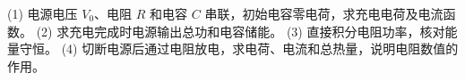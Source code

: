 (1) 电源电压 \(V_0\)、电阻 \(R\) 和电容 \(C\) 串联，初始电容零电荷，求充电电荷及电流函数。
(2) 求充电完成时电源输出总功和电容储能。
(3) 直接积分电阻功率，核对能量守恒。
(4) 切断电源后通过电阻放电，求电荷、电流和总热量，说明电阻数值的作用。
